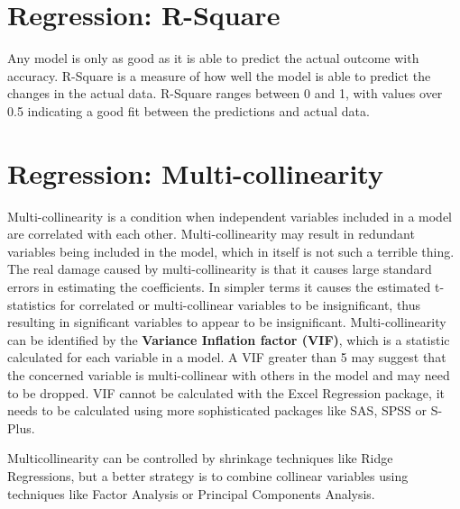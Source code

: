 \section{Regression: R-Square}


Any model is only as good as it is able to predict the actual outcome with accuracy. R-Square is a measure of how well the model is able to predict the changes in the actual data. R-Square ranges between 0 and 1, with values over 0.5 indicating a good fit between the predictions and actual data.
\section{Regression: Multi-collinearity}

Multi-collinearity is a condition when independent variables included in a model are correlated with each other. Multi-collinearity may result in redundant variables being included in the model, which in itself is not such a terrible thing. The real damage caused by multi-collinearity is that it causes large standard errors in estimating the coefficients. In simpler terms it causes the estimated t-statistics for correlated or multi-collinear variables to be insignificant, thus resulting in significant variables to appear to be insignificant. Multi-collinearity can be identified by the \textbf{Variance Inflation factor (VIF)}, which is a statistic calculated for each variable in a model. A VIF greater than 5 may suggest that the concerned variable is multi-collinear with others in the model and may need to be dropped. VIF cannot be calculated with the Excel Regression package, it needs to be calculated using more sophisticated packages like SAS, SPSS or S-Plus.

Multicollinearity can be controlled by shrinkage techniques like Ridge Regressions, but a better strategy is to combine collinear variables using techniques like Factor Analysis or Principal Components Analysis.


